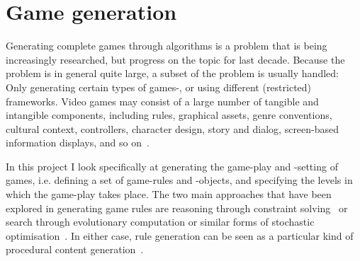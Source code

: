 \documentclass[a4paper,titlepage,final]{report}
\begin{document}
%
%
%
%




\section{Game generation}
\label{sec_gamegen}
Generating complete games through algorithms is a problem that is being increasingly researched, but progress on the topic for last decade. Because the problem is in general quite large, a subset of the problem is usually handled: Only generating certain types of games-, or using different (restricted) frameworks. 
Video games may consist of a large number of tangible and intangible components, including rules, graphical assets, genre conventions, cultural context, controllers, character design, story and dialog, screen-based information displays, and so on~\citep{cook2014angelina,liapis2014creativity,nelson2007automated}.

In this project I look specifically at generating the game-play and -setting of games, i.e. defining a set of game-rules and -objects, and specifying the levels in which the game-play takes place.
The two main approaches that have been explored in generating game rules are reasoning through constraint solving~\citep{smith2010variations} or search through evolutionary computation or similar forms of stochastic optimisation~\citep{togelius2008experiment,browne2008automated,font2013towards}. 
In either case, rule generation can be seen as a particular kind of procedural content generation~\citep{pcgbook:ch6}.
\end{document}
